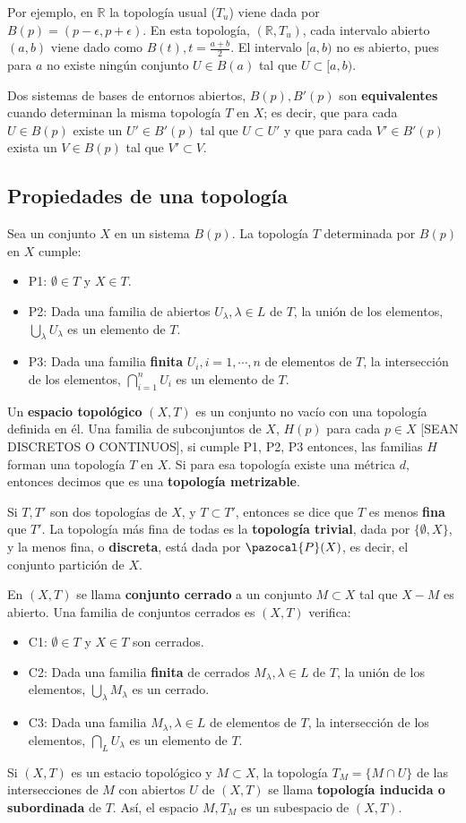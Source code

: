 \documentclass[a4paper, 11pt]{extarticle}
\let\mathcal\pazocal
\begin{document}
Por ejemplo, en \(\mathbb{R}\) la topología usual (\(T_u\)) viene dada por \(B(p) =
(p - \epsilon, p + \epsilon)\). En esta topología, \((\mathbb{R}, T_u)\),
cada intervalo abierto \((a,b)\) viene dado como \(B(t), t = \frac{a+b}{2}\). El intervalo \([a,b)\) no es abierto, pues para \(a\) no existe ningún
conjunto \(U \in B(a)\) tal que \(U \subset [a,b)\).

Dos sistemas de bases de entornos abiertos, \(B(p), B'(p)\) son \textbf{equivalentes}
cuando determinan la misma topología \(T\) en \(X\); es decir, que para cada
\(U \in B(p)\) existe un \(U' \in B'(p)\) tal que \(U \subset U'\) y que para cada \(V' \in B'(p)\) exista un \(V \in B(p)\) tal que \(V'
\subset V\).

\subsection{Propiedades de una topología}
\label{sec:org78ad095}
Sea un conjunto \(X\) en un sistema \(B(p)\). La topología \(T\)
determinada por \(B(p)\) en \(X\) cumple:
\begin{itemize}
\item P1: \(\emptyset \in T\) y \(X \in T\).
\item P2: Dada una familia de abiertos \(U_\lambda, \lambda \in L\) de \(T\), la
unión de los elementos, \(\bigcup_{\lambda} U_\lambda\) es un elemento de \(T\).
\item P3: Dada una familia \textbf{finita} \(U_i, i=1, \cdots, n\) de elementos de \(T\), la
intersección de los elementos, \(\bigcap_{i=1}^{n}U_i\) es un elemento de \(T\).
\end{itemize}

Un \textbf{espacio topológico} \((X, T)\) es un conjunto no vacío con una topología
definida en él. Una familia de subconjuntos de \(X\), \(H(p)\) para cada \(p \in X\) [SEAN DISCRETOS O CONTINUOS], si
cumple P1, P2, P3 entonces, las familias \(H\) forman una topología \(T\) en
\(X\). Si para esa topología existe una métrica \(d\), entonces decimos que
es una \textbf{topología metrizable}.

Si \(T, T'\) son dos topologías de \(X\), y \(T \subset T'\), entonces se dice que \(T\) es menos \textbf{fina} que \(T'\). La topología más
fina de todas es la \textbf{topología trivial}, dada por \(\{ \emptyset, X \}\), y la
menos fina, o \textbf{discreta}, está dada por \(\mathcal{P}(X)\), es decir, el
conjunto partición de \(X\). 

En \((X, T)\) se llama \textbf{conjunto cerrado} a un conjunto \(M \subset X\) tal que \(X-M\) es abierto. Una familia de conjuntos cerrados es \((X,T)\) verifica:
\begin{itemize}
\item C1: \(\emptyset \in T\) y \(X \in T\) son cerrados.
\item C2: Dada una familia \textbf{finita} de cerrados \(M_\lambda, \lambda \in L\) de \(T\), la
unión de los elementos, \(\bigcup_{\lambda} M_\lambda\) es un cerrado.
\item C3: Dada una familia \(M_\lambda, \lambda \in L\) de elementos de \(T\), la
intersección de los elementos, \(\bigcap_{L}U_\lambda\) es un elemento de \(T\).
\end{itemize}

Si \((X,T)\) es un estacio topológico y \(M \subset X\), la topología \(T_M = \{ M \cap U \}\) de las intersecciones de \(M\) con
abiertos \(U\) de \((X,T)\) se llama \textbf{topología inducida o subordinada} de \(T\). Así, el espacio \(M, T_M\) es un subespacio de \((X,T)\).
\end{document}
